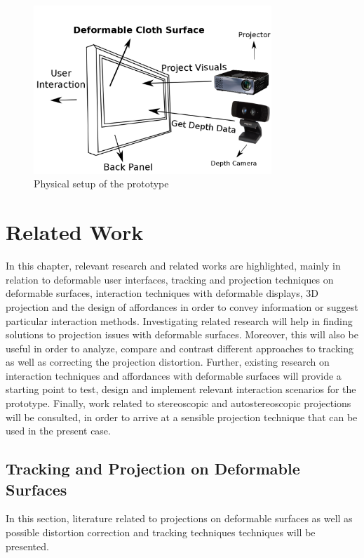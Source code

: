 \documentclass[]{article}
\begin{document}
\begin{figure}[hbtp]
    \centering
    \includegraphics[width=0.8\textwidth]{figures/thesis_setup_illustration_ui.png}
    \caption{Physical setup of the prototype}
    \label{fig:hardware_setup}
\end{figure}
\newpage
\section{Related Work}

In this chapter, relevant research and related works are highlighted, mainly in relation to deformable user interfaces, tracking and projection techniques on deformable surfaces, interaction techniques with deformable displays, 3D projection and the design of affordances in order to convey information or suggest particular interaction methods. Investigating related research will help in finding solutions to projection issues with deformable surfaces. Moreover, this will also be useful in order to analyze, compare and contrast different approaches to tracking as well as correcting the projection distortion. Further, existing research on interaction techniques and affordances with deformable surfaces will provide a starting point to test, design and implement relevant interaction scenarios for the prototype. Finally, work related to stereoscopic and autostereoscopic projections will be consulted, in order to arrive at a sensible projection technique that can be used in the present case.

\subsection{Tracking and Projection on Deformable Surfaces}

In this section, literature related to projections on deformable surfaces as well as possible distortion correction and tracking techniques techniques will be presented.\\
\end{document}
